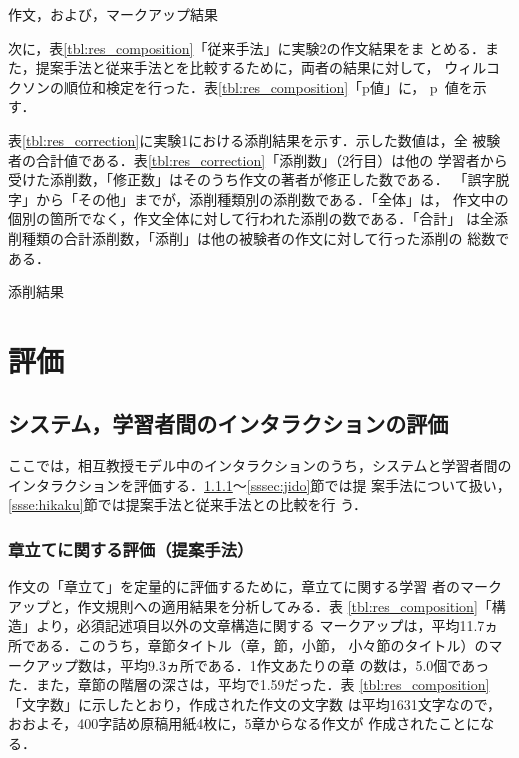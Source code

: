 \documentclass[japanese]{jnlp_1.4}
\def\mod{}
\begin{document}
\begin{table}[b]
 \caption{作文，および，マークアップ結果}\label{tbl:res_composition}

\end{table}


{\mod 次に，表\ref{tbl:res_composition}「従来手法」に実験2の作文結果をま
とめる．また，提案手法と従来手法とを比較するために，両者の結果に対して，
ウィルコクソンの順位和検定を行った．表\ref{tbl:res_composition}「p値」に，
p~値を示す．} 

表\ref{tbl:res_correction}に実験1における添削結果を示す．示した数値は，全
被験者の合計値である．表\ref{tbl:res_correction}「添削数」（2行目）は他の
学習者から受けた添削数，「修正数」はそのうち作文の著者が修正した数である．
「誤字脱字」から「その他」までが，添削種類別の添削数である．「全体」は，
作文中の個別の箇所でなく，作文全体に対して行われた添削の数である．「合計」
は全添削種類の合計添削数，「添削」は他の被験者の作文に対して行った添削の
総数である．



\begin{table}[t]
  \caption{添削結果}
  \label{tbl:res_correction}

\end{table}


\section{評価}\label{sec:evaluation}

\subsection{システム，学習者間のインタラクションの評価}

ここでは，相互教授モデル中のインタラクションのうち，システムと学習者間の
インタラクションを評価する．\ref{sssec:syodate}〜\ref{sssec:jido}節では提
案手法について扱い，\ref{ssse:hikaku}節では提案手法と従来手法との比較を行
う．


\subsubsection{章立てに関する評価（提案手法）}\label{sssec:syodate}

作文の「章立て」を定量的に評価するために，章立てに関する学習
者のマークアップと，作文規則への適用結果を分析してみる．表
\ref{tbl:res_composition}「構造」より，必須記述項目以外の文章構造に関する
マークアップは，平均11.7ヵ所である．このうち，章節タイトル（章，節，小節，
小々節のタイトル）のマークアップ数は，平均9.3ヵ所である．1作文あたりの章
の数は，5.0個であった．また，章節の階層の深さは，平均で1.59だった．表
\ref{tbl:res_composition}「文字数」に示したとおり，作成された作文の文字数
は平均1631文字なので，おおよそ，400字詰め原稿用紙4枚に，5章からなる作文が
作成されたことになる．
\end{document}

